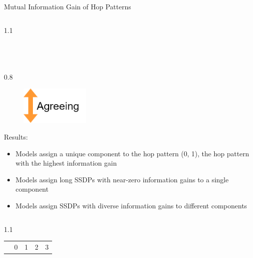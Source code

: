 \begin{alertblock}{Mutual Information Gain of Hop Patterns}
{\begin{column}{1.1\colwidth}
\end{column}
}
\\
\vspace{-1.5cm}
{
\begin{column}{0.8\colwidth}
\begin{figure}
    \vspace{-3.2cm}
    \includegraphics[width=0.3\textwidth]{images/agreement arrow.drawio.png}
\end{figure}
Results:
\begin{itemize}
    \item Models assign a unique component to the hop pattern (0, 1), the hop pattern with the highest information gain
    \item Models assign long SSDPs with near-zero information gains to a single component
    \item Models assign SSDPs with diverse information gains to different components
\end{itemize}
\end{column}
\begin{column}{1.1\colwidth}
\begin{table}[]
\vspace{1cm}
\captionsetup{justification=centering}
\small
\centering
\begin{subtable}{0.3\textwidth}
\centering
\begin{tabular}{|l|r|r|r|r|} 
\hline
\backslashbox{$\alpha$}{$\beta$} & 0 & 1 & 2 & 3  \\ 

\end{tabular}
\end{subtable}
\end{table}
\end{column}}
\end{alertblock}
